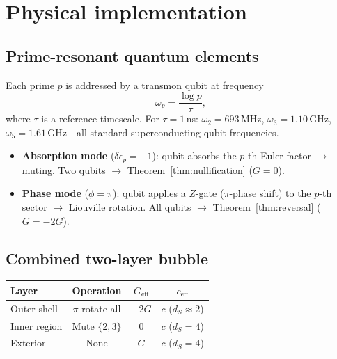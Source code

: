 \documentclass[aps,prd,twocolumn,superscriptaddress,nofootinbib]{revtex4-2}
\begin{document}
\section{Physical implementation}
\label{sec:implementation}

\subsection{Prime-resonant quantum elements}

Each prime $p$ is addressed by a transmon qubit at frequency
\begin{equation}
  \omega_p = \frac{\log p}{\tau},
\end{equation}
where $\tau$ is a reference timescale.
For $\tau = 1$\,ns: $\omega_2 = 693$\,MHz,
$\omega_3 = 1.10$\,GHz, $\omega_5 = 1.61$\,GHz---all
standard superconducting qubit frequencies.

\begin{itemize}
\item \textbf{Absorption mode} ($\delta\epsilon_p = -1$):
  qubit absorbs the $p$-th Euler factor $\to$ muting.
  Two qubits $\to$ Theorem~\ref{thm:nullification} ($G = 0$).
\item \textbf{Phase mode} ($\phi = \pi$):
  qubit applies a $Z$-gate ($\pi$-phase shift) to the $p$-th
  sector $\to$ Liouville rotation.
  All qubits $\to$ Theorem~\ref{thm:reversal} ($G = -2G$).
\end{itemize}

\subsection{Combined two-layer bubble}

\begin{center}
\begin{tabular}{lccc}
\toprule
Layer & Operation & $G_{\mathrm{eff}}$ & $c_{\mathrm{eff}}$ \\
\midrule
Outer shell & $\pi$-rotate all & $-2G$ & $c$ ($d_S \approx 2$) \\
Inner region & Mute $\{2,3\}$ & $0$ & $c$ ($d_S = 4$) \\
Exterior & None & $G$ & $c$ ($d_S = 4$) \\
\bottomrule
\end{tabular}
\end{center}
\end{document}
